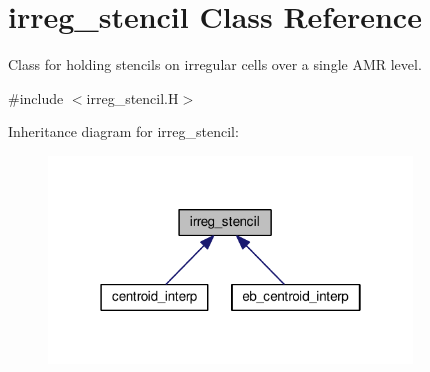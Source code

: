 \hypertarget{classirreg__stencil}{}\section{irreg\+\_\+stencil Class Reference}
\label{classirreg__stencil}


Class for holding stencils on irregular cells over a single A\+MR level.  




{\ttfamily \#include $<$irreg\+\_\+stencil.\+H$>$}



Inheritance diagram for irreg\+\_\+stencil\+:\nopagebreak
\begin{figure}[H]
\begin{center}
\leavevmode
\includegraphics[width=274pt]{classirreg__stencil__inherit__graph}
\end{center}
\end{figure}
